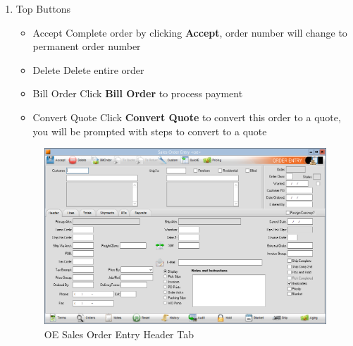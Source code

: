 \begin{enumerate}
	\item Top Buttons
	\begin{itemize}
		\item Accept \textemdash Complete order by clicking \textbf{Accept}, order number will change to permanent order number
		\item Delete \textemdash Delete entire order
		\item Bill Order \textemdash Click \textbf{Bill Order} to process payment
		\item Convert Quote \textemdash Click \textbf{Convert Quote} to convert this order to a quote, you will be prompted with steps to convert to a quote
	\end{itemize}
	
	\begin{figure}[H]
		\includegraphics[width=\textwidth]{../img/image92}
		\caption{OE Sales Order Entry Header Tab}
	\end{figure}
	

\end{enumerate}
